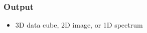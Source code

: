 \documentclass{article}
\begin{document}
\subsubsection{Output}

\begin{itemize}
  \item 3D data cube, 2D image, or 1D spectrum
\end{itemize}  

\end{document}

